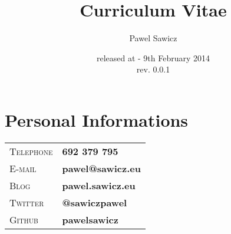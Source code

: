 \documentclass[a4paper, oneside, final]{article}
\title{Curriculum Vitae}
\author{Pawel Sawicz}
\date{released at - 9th February 2014 \\ rev. 0.0.1   }
\begin{document}
\maketitle

\section{Personal Informations }
\begin{center}
\begin{tabularx}{0.97\linewidth}{>{\raggedleft\scshape}p{2cm}X}
 Telephone & \textbf{692 379 795}\\
 E-mail & \textbf{pawel@sawicz.eu}\\
 Blog & \textbf{pawel.sawicz.eu}\\
Twitter & \textbf{@sawiczpawel}\\
Github & \textbf{pawelsawicz}\\
\end{tabularx}
\end{center}
\end{document}
